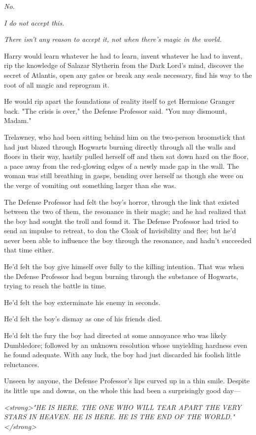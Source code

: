 \emph{No.}

\emph{I do not accept this.}

\emph{There isn't any reason to accept it, not when there's magic in the world.}

Harry would learn whatever he had to learn, invent whatever he had to invent, 
rip the knowledge of Salazar Slytherin from the Dark Lord's mind, discover the 
secret of Atlantis, open any gates or break any seals necessary, find his way 
to the root of all magic and reprogram it.

He would rip apart the foundations of reality itself to get Hermione Granger 
back.
\sbreak
"The crisis is over," the Defense Professor said. "You may dismount, Madam."

Trelawney, who had been sitting behind him on the two-person broomstick that 
had just blazed through Hogwarts burning directly through all the walls and 
floors in their way, hastily pulled herself off and then sat down hard on the 
floor, a pace away from the red-glowing edges of a newly made gap in the wall. 
The woman was still breathing in gasps, bending over herself as though she were 
on the verge of vomiting out something larger than she was.

The Defense Professor had felt the boy's horror, through the link that existed 
between the two of them, the resonance in their magic; and he had realized that 
the boy had sought the troll and found it. The Defense Professor had tried to 
send an impulse to retreat, to don the Cloak of Invisibility and flee; but he'd 
never been able to influence the boy through the resonance, and hadn't 
succeeded that time either.

He'd felt the boy give himself over fully to the killing intention. That was 
when the Defense Professor had begun burning through the substance of Hogwarts, 
trying to reach the battle in time.

He'd felt the boy exterminate his enemy in seconds.

He'd felt the boy's dismay as one of his friends died.

He'd felt the fury the boy had directed at some annoyance who was likely 
Dumbledore; followed by an unknown resolution whose unyielding hardness even he 
found adequate. With any luck, the boy had just discarded his foolish little 
reluctances.

Unseen by anyone, the Defense Professor's lips curved up in a thin smile. 
Despite its little ups and downs, on the whole this had been a surprisingly 
good day---

\emph{<strong>"HE IS HERE. THE ONE WHO WILL TEAR APART THE VERY STARS IN 
HEAVEN. HE IS HERE. HE IS THE END OF THE WORLD."</strong>}